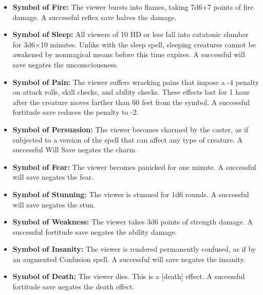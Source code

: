 \begin{itemize}
 \item \textbf{Symbol of Fire:} The viewer bursts into flames, taking 7d6+7 points of fire damage.
 A successful reflex save halves the damage.
 \item \textbf{Symbol of Sleep:} All viewers of 10 HD or less fall into catatonic slumber for
 3d6$\times$10 minutes. Unlike with the sleep spell, sleeping creatures cannot be awakened by nonmagical means before this time expires.
 A successful will save negates the unconsciousness.
 \item \textbf{Symbol of Pain:} The viewer suffers wracking pains that impose a -4 penalty on attack rolls, 
 skill checks, and ability checks. These effects last for 1 hour after the creature moves farther than 60 feet from the symbol.
 A successful fortitude save reduces the penalty to -2.
 \item \textbf{Symbol of Persuasion:} The viewer becomes charmed by the caster, as if subjected to a version of the 
 spell that can affect any type of creature.
 A successful Will Save negates the charm.
 \item \textbf{Symbol of Fear:} The viewer becomes panicked for one minute. A successful will save negates the fear.
 \item \textbf{Symbol of Stunning:} The viewer is stunned for 1d6 rounds. A successful will save negates the stun.
 \item \textbf{Symbol of Weakness:} The viewer takes 3d6 points of strength damage. A successful fortitude save negates the ability damage.
 \item \textbf{Symbol of Insanity:} The viewer is rendered permanently confused, as if by an augmented Confusion spell. A successful will save negates the insanity.
 \item \textbf{Symbol of Death:} The viewer dies. This is a [death] effect. A successful fortitude save negates the death effect.
\end{itemize}

